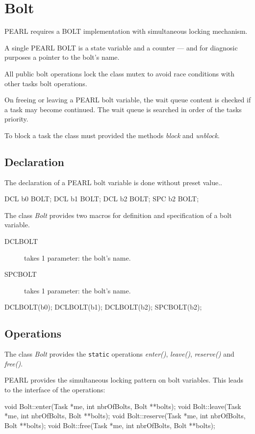 \chapter{Bolt}
PEARL requires a BOLT implementation with simultaneous locking
mechanism.

A single PEARL BOLT is
a state variable and a counter --- 
and for diagnosic purposes a pointer to the bolt's name.

All public bolt operations lock the class mutex to avoid race conditions 
with other tasks bolt operations.

On freeing or leaving a PEARL bolt variable,
 the wait queue content is checked if a 
task may become continued. The wait queue is searched in order of the tasks 
priority. 

To block a task the class must provided the methods {\em block} and 
{\em unblock}.

\section{Declaration}
The declaration of a PEARL bolt variable is done without preset value..

\begin{PEARLCode}
DCL b0 BOLT;
DCL b1 BOLT;
DCL b2 BOLT;
SPC b2 BOLT;
\end{PEARLCode}

The class {\em Bolt} provides two macros for definition and 
specification of a bolt variable.
\begin{description}
\item[DCLBOLT] takes 1 parameter: the bolt's name.
\item[SPCBOLT] takes 1 parameter:  the bolt's name.
\end{description}

\begin{CppCode}
DCLBOLT(b0);
DCLBOLT(b1);
DCLBOLT(b2);
SPCBOLT(b2);
\end{CppCode}

\section{Operations}
The class {\em Bolt} provides the \verb|static| operations 
{\em enter()}, {\em leave()}, {\em reserve()} and  {\em free()}.

PEARL provides the simultaneous locking pattern on bolt variables.
This leads to the interface of the operations:
\begin{CppCode}
void Bolt::enter(Task *me, int nbrOfBolts, Bolt **bolts);
void Bolt::leave(Task *me, int nbrOfBolts, Bolt **bolts);
void Bolt::reserve(Task *me, int nbrOfBolts, Bolt **bolts);
void Bolt::free(Task *me, int nbrOfBolts, Bolt **bolts);
\end{CppCode}

